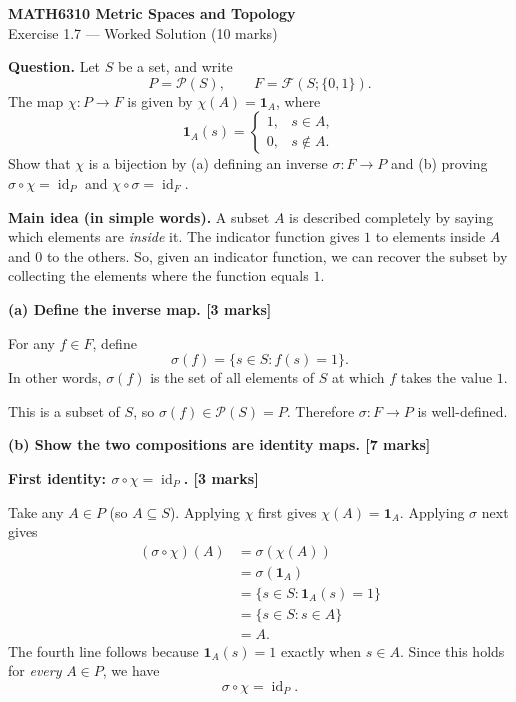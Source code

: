 \documentclass[11pt,a4paper]{article}
\begin{document}
\begin{center}
{\Large\bfseries MATH6310 Metric Spaces and Topology}\\[3pt]
{\large Exercise 1.7 --- Worked Solution (10 marks)}
\end{center}

\textbf{Question.} Let $S$ be a set, and write
\[
P=\mathcal P(S), \qquad F=\mathcal F(S;\{0,1\}).
\]
The map $\chi:P\to F$ is given by $\chi(A)=\mathbf 1_A$, where
\[
\mathbf 1_A(s)=\begin{cases}1,&s\in A,\\0,&s\notin A.\end{cases}
\]
Show that $\chi$ is a bijection by (a) defining an inverse $\sigma:F\to P$ and (b) proving
$\sigma\circ\chi=\operatorname{id}_P$ and $\chi\circ\sigma=\operatorname{id}_F$.

\textbf{Main idea (in simple words).} A subset $A$ is described completely by saying which elements are \emph{inside} it. The indicator function gives $1$ to elements inside $A$ and $0$ to the others. So, given an indicator function, we can recover the subset by collecting the elements where the function equals $1$.

\textbf{(a) Define the inverse map. \hfill [3 marks]}

For any $f\in F$, define
\[
\boxed{\sigma(f)=\{s\in S:f(s)=1\}.}
\]
In other words, $\sigma(f)$ is the set of all elements of $S$ at which $f$ takes the value $1$.

This is a subset of $S$, so $\sigma(f)\in\mathcal P(S)=P$. Therefore $\sigma:F\to P$ is well-defined.

\textbf{(b) Show the two compositions are identity maps. \hfill [7 marks]}

\textbf{First identity: $\sigma\circ\chi=\operatorname{id}_P$. \hfill [3 marks]}

Take any $A\in P$ (so $A\subseteq S$). Applying $\chi$ first gives $\chi(A)=\mathbf 1_A$. Applying $\sigma$ next gives
\begin{align*}
(\sigma\circ\chi)(A)
  &=\sigma(\chi(A))\\
  &=\sigma(\mathbf 1_A)\\
  &=\{s\in S:\mathbf 1_A(s)=1\}\\
  &=\{s\in S:s\in A\}\\
  &=A.
\end{align*}
The fourth line follows because $\mathbf 1_A(s)=1$ exactly when $s\in A$.
Since this holds for \emph{every} $A\in P$, we have
\[
\boxed{\sigma\circ\chi=\operatorname{id}_P.}
\]
\end{document}
